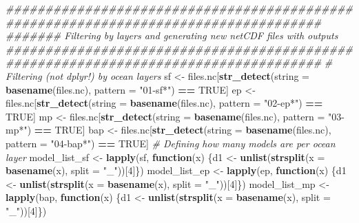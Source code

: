 \documentclass[]{book}
\newenvironment{Shaded}{\begin{snugshade}}{\end{snugshade}}
\newcommand{\CommentTok}[1]{\textcolor[rgb]{0.56,0.35,0.01}{\textit{#1}}}
\newcommand{\ControlFlowTok}[1]{\textcolor[rgb]{0.13,0.29,0.53}{\textbf{#1}}}
\newcommand{\DataTypeTok}[1]{\textcolor[rgb]{0.13,0.29,0.53}{#1}}
\newcommand{\DecValTok}[1]{\textcolor[rgb]{0.00,0.00,0.81}{#1}}
\newcommand{\KeywordTok}[1]{\textcolor[rgb]{0.13,0.29,0.53}{\textbf{#1}}}
\newcommand{\NormalTok}[1]{#1}
\newcommand{\OperatorTok}[1]{\textcolor[rgb]{0.81,0.36,0.00}{\textbf{#1}}}
\newcommand{\OtherTok}[1]{\textcolor[rgb]{0.56,0.35,0.01}{#1}}
\newcommand{\StringTok}[1]{\textcolor[rgb]{0.31,0.60,0.02}{#1}}
\begin{document}
\begin{Shaded}
\begin{Highlighting}[]
{\CommentTok{####################################################################################}
\CommentTok{####### Filtering by layers and generating new netCDF files with outputs}
\CommentTok{#################################################################################### }
  \CommentTok{# Filtering (not dplyr!) by ocean layers}
\NormalTok{    sf <-}\StringTok{ }\NormalTok{files.nc[}\KeywordTok{str_detect}\NormalTok{(}\DataTypeTok{string =} \KeywordTok{basename}\NormalTok{(files.nc), }\DataTypeTok{pattern =} \StringTok{"01-sf*"}\NormalTok{) }\OperatorTok{==}\StringTok{ }\OtherTok{TRUE}\NormalTok{]}
\NormalTok{    ep <-}\StringTok{ }\NormalTok{files.nc[}\KeywordTok{str_detect}\NormalTok{(}\DataTypeTok{string =} \KeywordTok{basename}\NormalTok{(files.nc), }\DataTypeTok{pattern =} \StringTok{"02-ep*"}\NormalTok{) }\OperatorTok{==}\StringTok{ }\OtherTok{TRUE}\NormalTok{]}
\NormalTok{    mp <-}\StringTok{ }\NormalTok{files.nc[}\KeywordTok{str_detect}\NormalTok{(}\DataTypeTok{string =} \KeywordTok{basename}\NormalTok{(files.nc), }\DataTypeTok{pattern =} \StringTok{"03-mp*"}\NormalTok{) }\OperatorTok{==}\StringTok{ }\OtherTok{TRUE}\NormalTok{]}
\NormalTok{    bap <-}\StringTok{ }\NormalTok{files.nc[}\KeywordTok{str_detect}\NormalTok{(}\DataTypeTok{string =} \KeywordTok{basename}\NormalTok{(files.nc), }\DataTypeTok{pattern =} \StringTok{"04-bap*"}\NormalTok{) }\OperatorTok{==}\StringTok{ }\OtherTok{TRUE}\NormalTok{]}
  \CommentTok{# Defining how many models are per ocean layer }
\NormalTok{    model_list_sf <-}\StringTok{ }\KeywordTok{lapply}\NormalTok{(sf, }\ControlFlowTok{function}\NormalTok{(x) }
\NormalTok{      \{d1 <-}\StringTok{ }\KeywordTok{unlist}\NormalTok{(}\KeywordTok{strsplit}\NormalTok{(}\DataTypeTok{x =} \KeywordTok{basename}\NormalTok{(x), }\DataTypeTok{split =} \StringTok{"_"}\NormalTok{))[}\DecValTok{4}\NormalTok{]\})}
\NormalTok{    model_list_ep <-}\StringTok{ }\KeywordTok{lapply}\NormalTok{(ep, }\ControlFlowTok{function}\NormalTok{(x) }
\NormalTok{      \{d1 <-}\StringTok{ }\KeywordTok{unlist}\NormalTok{(}\KeywordTok{strsplit}\NormalTok{(}\DataTypeTok{x =} \KeywordTok{basename}\NormalTok{(x), }\DataTypeTok{split =} \StringTok{"_"}\NormalTok{))[}\DecValTok{4}\NormalTok{]\})}
\NormalTok{    model_list_mp <-}\StringTok{ }\KeywordTok{lapply}\NormalTok{(bap, }\ControlFlowTok{function}\NormalTok{(x) }
\NormalTok{      \{d1 <-}\StringTok{ }\KeywordTok{unlist}\NormalTok{(}\KeywordTok{strsplit}\NormalTok{(}\DataTypeTok{x =} \KeywordTok{basename}\NormalTok{(x), }\DataTypeTok{split =} \StringTok{"_"}\NormalTok{))[}\DecValTok{4}\NormalTok{]\})}
}
\end{Highlighting}
\end{Shaded}
\end{document}
